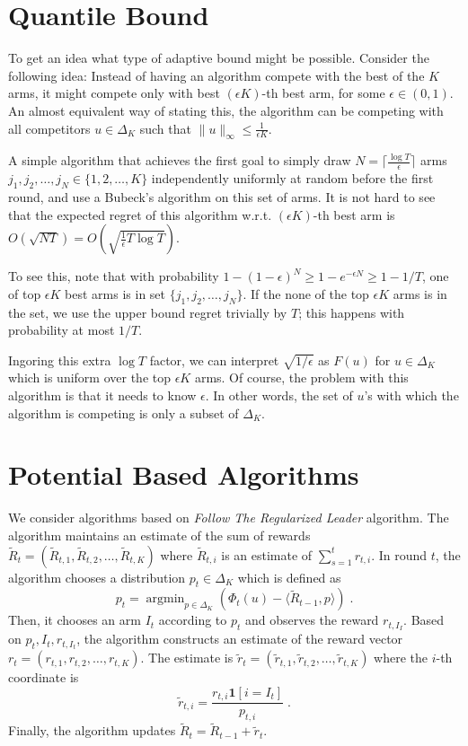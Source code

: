 \documentclass{article}
\newcommand{\norm}[1]{\|#1\|}
\newcommand{\indicator}{\mathbf{1}}
\DeclareMathOperator{\argmin}{argmin}
\begin{document}
\section{Quantile Bound}

To get an idea what type of adaptive bound might be possible. Consider the
following idea: Instead of having an algorithm compete with the best of the $K$
arms, it might compete only with best $(\epsilon K)$-th best arm, for some
$\epsilon \in (0,1)$. An almost equivalent way of stating this, the algorithm
can be competing with all competitors $u \in \Delta_K$ such that
$\norm{u}_\infty \le \frac{1}{\epsilon K}$.

A simple algorithm that achieves the first goal to simply draw $N =
\lceil \frac{\log T}{\epsilon} \rceil$ arms $j_1, j_2, \dots, j_N \in \{1,2, \dots, K\}$
independently uniformly at random before the first round, and use a Bubeck's
algorithm on this set of arms. It is not hard to see that the expected regret
of this algorithm w.r.t. $(\epsilon K)$-th best arm is
$O(\sqrt{N T}) = O \left(\sqrt{\frac{1}{\epsilon} T \log T} \right)$.

To see this, note that with probability $1 - (1-\epsilon)^N \ge 1 -
e^{-\epsilon N} \ge 1 - 1/T$, one of top $\epsilon K$ best arms is in set
$\{j_1, j_2, \dots, j_N\}$.  If the none of the top $\epsilon K$ arms is in the
set, we use the upper bound regret trivially by $T$; this happens with
probability at most $1/T$.

Ingoring this extra $\log T$ factor, we can interpret $\sqrt{1/\epsilon}$ as
$F(u)$ for $u \in \Delta_K$ which is uniform over the top $\epsilon K$ arms.
Of course, the problem with this algorithm is that it needs to know $\epsilon$.
In other words, the set of $u$'s with which the algorithm is competing is only
a subset of $\Delta_K$.

\section{Potential Based Algorithms}

We consider algorithms based on \emph{Follow The Regularized Leader} algorithm.
The algorithm maintains an estimate of the sum of rewards $\widetilde R_t =
(\widetilde R_{t,1}, \widetilde R_{t,2}, \dots, \widetilde R_{t,K})$ where $\widetilde R_{t,i}$
is an estimate of $\sum_{s=1}^t r_{t,i}$.
In round $t$, the algorithm chooses a distribution $p_t \in \Delta_K$ which
is defined as
$$
p_t = \argmin_{p \in \Delta_K} \left( \Phi_t(u) - \langle \widetilde R_{t-1}, p \rangle \right) \; .
$$
Then, it chooses an arm $I_t$ according to $p_t$ and observes the reward $r_{t,I_I}$.
Based on $p_t, I_t, r_{t,I_t}$, the algorithm constructs an estimate of the reward vector $r_t = (r_{t,1}, r_{t,2}, \dots, r_{t,K})$.
The estimate is $\widetilde r_t = (\widetilde r_{t,1}, \widetilde r_{t,2}, \dots, \widetilde r_{t,K})$
where the $i$-th coordinate is
$$
\widetilde r_{t,i} = \frac{r_{t,i} \indicator[i=I_t]}{p_{t,i}}  \; .
$$
Finally, the algorithm updates $\widetilde R_t = \widetilde R_{t-1} + \widetilde r_t$.
\end{document}
